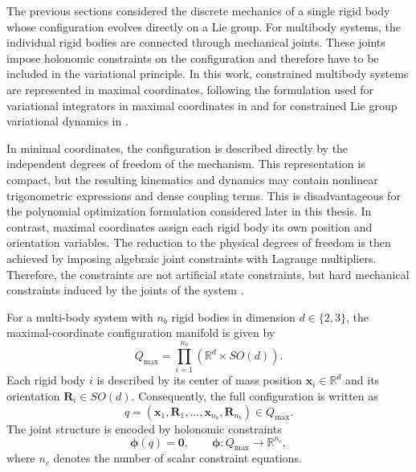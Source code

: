 The previous sections considered the discrete mechanics of a single rigid body whose
configuration evolves directly on a Lie group. For multibody systems, the individual
rigid bodies are connected through mechanical joints. These joints impose holonomic
constraints on the configuration and therefore have to be included in the variational
principle. In this work, constrained multibody systems are represented in maximal
coordinates, following the formulation used for variational integrators in
maximal coordinates in \cite{BrudigamManchester2021LQR} and for constrained
Lie group variational dynamics in \cite{Sangli2025}.

In minimal coordinates, the configuration is described directly by the independent
degrees of freedom of the mechanism. This representation is compact, but the
resulting kinematics and dynamics may contain nonlinear trigonometric expressions
and dense coupling terms. This is disadvantageous for the polynomial optimization
formulation considered later in this thesis. In contrast, maximal coordinates assign
each rigid body its own position and orientation variables. The reduction to the
physical degrees of freedom is then achieved by imposing algebraic joint constraints
with Lagrange multipliers. Therefore, the constraints are not artificial state
constraints, but hard mechanical constraints induced by the joints of the system
\cite{BrudigamManchester2021VariationalIntegrators}.

For a multi-body system with \(n_b\) rigid bodies in dimension
\(d\in\{2,3\}\), the maximal-coordinate configuration manifold is given by
\begin{equation}
    Q_{\mathrm{max}}
    =
    \prod_{i=1}^{n_b}
    \left(
    \mathbb{R}^{d} \times SO(d)
    \right).
    \label{eq:q_max_general}
\end{equation}
Each rigid body \(i\) is described by its center of mass position
\(\bm{x}_i\in\mathbb{R}^{d}\) and its orientation
\(\bm{R}_i\in SO(d)\). Consequently, the full configuration is written as
\begin{equation}
    q =
    \left(
    \bm{x}_1,\bm{R}_1,\ldots,\bm{x}_{n_b},\bm{R}_{n_b}
    \right)
    \in Q_{\mathrm{max}}.
    \label{eq:q_max_state_general}
\end{equation}
The joint structure is encoded by holonomic constraints
\begin{equation}
    \bm{\phi}(q)=\bm{0},
    \qquad
    \bm{\phi}:Q_{\mathrm{max}}\rightarrow\mathbb{R}^{n_c},
    \label{eq:holonomic_constraints_general}
\end{equation}
where \(n_c\) denotes the number of scalar constraint equations.

